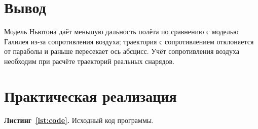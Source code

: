 \documentclass[a4paper, 14pt]{extarticle}
\begin{document}
\section{Вывод}

Модель Ньютона даёт меньшую дальность полёта по сравнению с моделью Галилея из-за сопротивления воздуха; траектория с сопротивлением отклоняется от параболы и раньше пересекает ось абсцисс. Учёт сопротивления воздуха необходим при расчёте траекторий реальных снарядов.

\section{Практическая реализация}

\label{lst:code}
\noindent\textbf{Листинг~\ref{lst:code}.} Исходный код программы.
\end{document}
